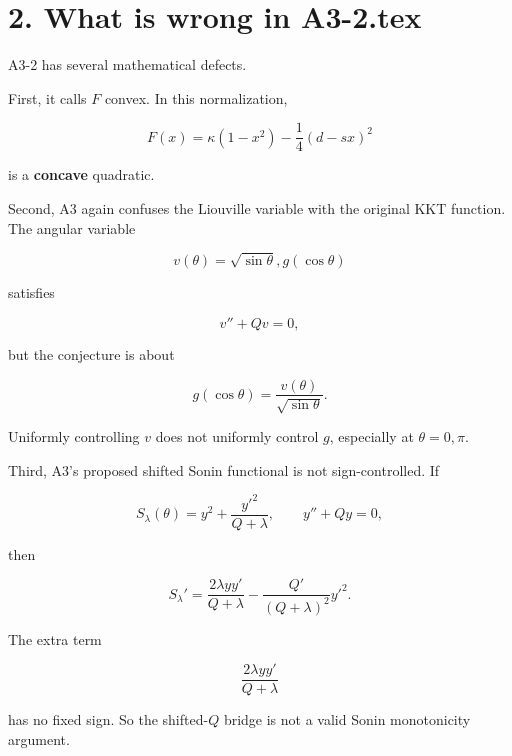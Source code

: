 \documentclass[11pt]{article}
\begin{document}
\section*{2. What is wrong in A3-2.tex}

A3-2 has several mathematical defects.

First, it calls \(F\) convex. In this normalization,

\begin{equation*}
F(x)=\kappa(1-x^2)-\frac14(d-sx)^2
\end{equation*}


is a \textbf{concave} quadratic.

Second, A3 again confuses the Liouville variable with the original KKT function. The angular variable

\begin{equation*}
v(\theta)=\sqrt{\sin\theta},g(\cos\theta)
\end{equation*}


satisfies

\begin{equation*}
v''+Qv=0,
\end{equation*}


but the conjecture is about

\begin{equation*}
g(\cos\theta)=\frac{v(\theta)}{\sqrt{\sin\theta}}.
\end{equation*}


Uniformly controlling \(v\) does not uniformly control \(g\), especially at \(\theta=0,\pi\).

Third, A3's proposed shifted Sonin functional is not sign-controlled. If

\begin{equation*}
S_\lambda(\theta)=y^2+\frac{y'^2}{Q+\lambda},
\qquad y''+Qy=0,
\end{equation*}


then

\begin{equation*}
\boxed{
S_\lambda'
=
\frac{2\lambda yy'}{Q+\lambda}
-
\frac{Q'}{(Q+\lambda)^2}y'^2.
}
\tag{3}
\end{equation*}


The extra term

\begin{equation*}
\frac{2\lambda yy'}{Q+\lambda}
\end{equation*}


has no fixed sign. So the shifted-\(Q\) bridge is not a valid Sonin monotonicity argument.
\end{document}
